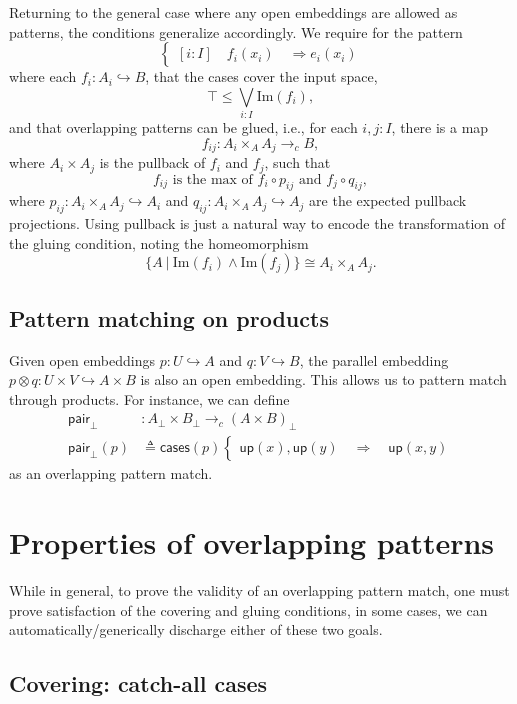 \documentclass[conference]{IEEEtran}
\newcommand{\hookto}{\hookrightarrow}
\newcommand{\cto}{\to_c}
\newcommand{\suchthat}{\ |\ }
\newcommand{\Img}[1]{\text{Im}\left({#1}\right)}
\newcommand{\Branch}{\Rightarrow}
\newcommand{\up}{\mathsf{up}}
\newcommand{\isthemaxof}[3]{{#1}\text{ is the max of }{#2}\text{ and }{#3}}
\begin{document}
Returning to the general case where any open embeddings are allowed as patterns, the conditions generalize accordingly. We require for the pattern
\[
\begin{cases}
[i : I] \quad f_i(x_i) \quad \Branch e_i(x_i)
\end{cases}
\]
where each $f_i : A_i \hookto B$, that the cases cover the input space,
\[
\top \le \bigvee_{i : I} \Img{f_i},
\]
and that overlapping patterns can be glued, i.e., for each $i, j : I$, there is a map
\[
f_{ij} : A_i \times_A A_j \cto B,
\]
where $A_i \times A_j$ is the pullback of $f_i$ and $f_j$, such that 
\[
\isthemaxof{ f_{ij} }{ f_i \circ p_{ij}}{ f_j \circ q_{ij}},
\]
where $p_{ij} : A_i \times_A A_j \hookto A_i$ and $q_{ij} : A_i \times_A A_j \hookto A_j$ are the expected pullback projections. Using pullback is just a natural way to encode the transformation of the gluing condition, noting the homeomorphism
\[
 \{A \suchthat \Img{f_i} \wedge \Img{f_j} \} \cong A_i \times_A A_j.
\]

\subsection{Pattern matching on products}

Given open embeddings $p : U \hookto A$ and $q : V \hookto B$, the parallel embedding $p \otimes q : U \times V \hookto A \times B$ is also an open embedding. This allows us to pattern match through products. 
For instance, we can define
\begin{align*}
 \mathsf{pair}_\bot &: A_\bot \times B_\bot \cto \left( A \times B \right)_\bot
\\ \mathsf{pair}_\bot(p) &\triangleq \mathsf{cases}(p)
\begin{cases}
\up(x) , \up(y)
  \quad \Branch \quad \up(x, y)
\end{cases}
\end{align*}
as an overlapping pattern match.

\section{Properties of overlapping patterns}
\label{s:properties}

While in general, to prove the validity of an overlapping pattern match, one must prove satisfaction of the covering and gluing conditions, in some cases, we can automatically/generically discharge either of these two goals. 

\subsection{Covering: catch-all cases}
\end{document}
